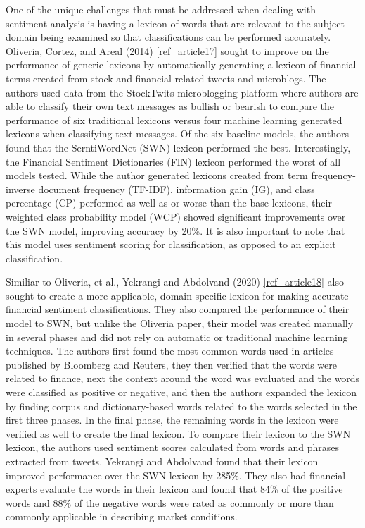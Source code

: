 \documentclass{llncs}
\begin{document}
One of the unique challenges that must be addressed when dealing with sentiment analysis is having a lexicon of words that are relevant to the subject domain being examined so that classifications can be performed accurately. Oliveria, Cortez, and Areal (2014) \ref{ref_article17} sought to improve on the performance of generic lexicons by automatically generating a lexicon of financial terms created from stock and financial related tweets and microblogs. The authors used data from the StockTwits microblogging platform where authors are able to classify their own text messages as bullish or bearish to compare the performance of six traditional lexicons versus four machine learning generated lexicons when classifying text messages. Of the six baseline models, the authors found that the SerntiWordNet (SWN) lexicon performed the best. Interestingly, the Financial Sentiment Dictionaries (FIN) lexicon performed the worst of all models tested. While the author generated lexicons created from term frequency-inverse document frequency (TF-IDF), information gain (IG), and class percentage (CP) performed as well as or worse than the base lexicons, their weighted class probability model (WCP) showed significant improvements over the SWN model, improving accuracy by 20\%. It is also important to note that this model uses sentiment scoring for classification, as opposed to an explicit classification. 

Similiar to Oliveria, et al., Yekrangi and Abdolvand (2020) \ref{ref_article18} also sought to create a more applicable, domain-specific lexicon for making accurate financial sentiment classifications. They also compared the performance of their model to SWN, but unlike the Oliveria paper, their model was created manually in several phases and did not rely on automatic or traditional machine learning techniques. The authors first found the most common words used in articles published by Bloomberg and Reuters, they then verified that the words were related to finance, next the context around the word was evaluated and the words were classified as positive or negative, and then the authors expanded the lexicon by finding corpus and dictionary-based words related to the words selected in the first three phases. In the final phase, the remaining words in the lexicon were verified as well to create the final lexicon. To compare their lexicon to the SWN lexicon, the authors used sentiment scores calculated from words and phrases extracted from tweets. Yekrangi and Abdolvand found that their lexicon improved performance over the SWN lexicon by 285\%. They also had financial experts evaluate the words in their lexicon and found that 84\% of the positive words and 88\% of the negative words were rated as commonly or more than commonly applicable in describing market conditions.
\end{document}
